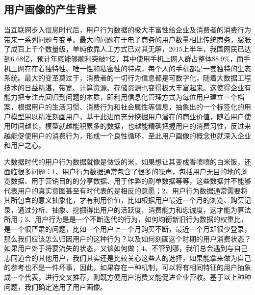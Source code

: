 	\subsection{用户画像的产生背景}
	当互联网步入信息时代后，用户行为数据的极大丰富性给企业及消费者的消费行为带来一系列问题与变革。最大的问题在于电子商务的用户数量相比传统商务，膨胀了成百上千个数量级，单纯依靠人工方式已对其无解，2015上半年，我国网民已达到6.68亿，预计年底能够顺利突破7亿，其中使用手机上网人群占整体88.9\%，而手机上网存在着独特性、唯一性和私密性的特点，每个人的手机都是一套独特的生态系统。最大的变革莫过于，消费者的一切行为信息都是可数字化，随着大数据工程技术的日益精湛，带宽、计算资源、存储资源也变得极大丰富起来。这使得企业有能力把专注点回归到问题的本质，即利用信息化管理方式为每位用户建立一个档案，根据用户的生活习惯、消费行为和社会属性等信息，抽象出的一个标签化的用户模型用以精准刻画用户，基于此进而充分挖掘用户潜在的商业价值，随着用户使用时间越长，模型就越能积累多的数据，也越能精确把握用户的消费习性，反过来越能促使用户的消费行为，形成一个良性循环，至此用户画像的概念也就深入企业和用户之心。

	大数据时代的用户行为数据就像是做饭的米，如果想让其变成香喷喷的白米饭，还面临很多问题：1、用户行为数据通常包含了很多的噪声，包括用户无目的地的浏览数据、用于营销目的的分享数据、用于作弊的刷单数据等等，这些数据并不能够代表用户的真实意图甚至有时代表的是相反的意愿；2、用户行为数据通常需要将其所包含的意义抽象化，才有利用价值，比如根据用户最近一个月的浏览、购买记录，通过分析、抽象、挖掘得出用户的活跃度、消费能力和忠诚度，这才能为算法所用；3、用户行为是是一个不断迭代的行为，如何均衡新旧行为数据的权重比，是一个很严肃的问题，比如一个用户上一个月购买不断，最近一个月却很少登录，那么我们应该怎么归因用户的这种行为？以及如何刻画这个时期的用户消费状态？如果用户处于将要流失的状态，又该如何做；4、不管到哪，我们总会遇到与自己志同道合的其他用户，我们其实还是比较关心这些人的选择，如果能拿来做为自己的参考也不是一件坏事，因此，如果存在一种机制，可以将有相同特征的用户抽象成一个代表，进行交叉推荐，则既方便用户消费又能促进企业营收。基于以上种种问题，我们确定选用了用户画像。

